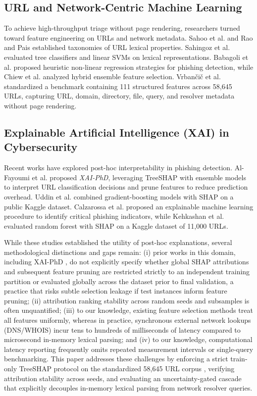 \subsection{URL and Network-Centric Machine Learning}
To achieve high-throughput triage without page rendering, researchers turned toward feature engineering on URLs and network metadata. Sahoo et al. \cite{sahoo2017malicious} and Rao and Pais \cite{rao2019detection} established taxonomies of URL lexical properties. Sahingoz et al. \cite{sahingoz2019machine} evaluated tree classifiers and linear SVMs on lexical representations. Babagoli et al. \cite{babagoli2019heuristic} proposed heuristic non-linear regression strategies for phishing detection, while Chiew et al. \cite{chiew2019new} analyzed hybrid ensemble feature selection. Vrban{\v{c}}i{\v{c}} et al. \cite{vrbancic2020datasets} standardized a benchmark containing 111 structured features across 58,645 URLs, capturing URL, domain, directory, file, query, and resolver metadata without page rendering.

\subsection{Explainable Artificial Intelligence (XAI) in Cybersecurity}
Recent works have explored post-hoc interpretability in phishing detection. Al-Fayoumi et al. \cite{alfayoumi2024xaiphd} proposed \textit{XAI-PhD}, leveraging TreeSHAP with ensemble models to interpret URL classification decisions and prune features to reduce prediction overhead. Uddin et al. \cite{uddin2025explainable} combined gradient-boosting models with SHAP on a public Kaggle dataset. Calzarossa et al. \cite{calzarossa2024explainable} proposed an explainable machine learning procedure to identify critical phishing indicators, while Kehkashan et al. \cite{kehkashan2025explainable} evaluated random forest with SHAP on a Kaggle dataset of 11,000 URLs.

While these studies established the utility of post-hoc explanations, several methodological distinctions and gaps remain: (i) prior works in this domain, including XAI-PhD \cite{alfayoumi2024xaiphd}, do not explicitly specify whether global SHAP attributions and subsequent feature pruning are restricted strictly to an independent training partition or evaluated globally across the dataset prior to final validation, a practice that risks subtle selection leakage if test instances inform feature pruning; (ii) attribution ranking stability across random seeds and subsamples is often unquantified; (iii) to our knowledge, existing feature selection methods treat all features uniformly, whereas in practice, synchronous external network lookups (DNS/WHOIS) incur tens to hundreds of milliseconds of latency compared to microsecond in-memory lexical parsing; and (iv) to our knowledge, computational latency reporting frequently omits repeated measurement intervals or single-query benchmarking. This paper addresses these challenges by enforcing a strict train-only TreeSHAP protocol on the standardized 58,645 URL corpus \cite{vrbancic2020datasets}, verifying attribution stability across seeds, and evaluating an uncertainty-gated cascade that explicitly decouples in-memory lexical parsing from network resolver queries.

